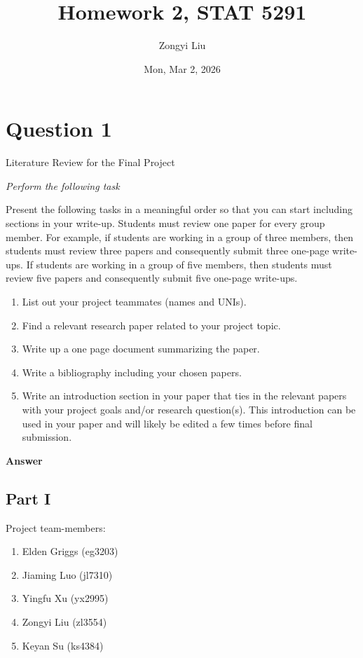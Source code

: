 \documentclass[letterpaper]{article}
\title{Homework 2, STAT 5291}
\author{Zongyi Liu}
\date{Mon, Mar 2, 2026}
\begin{document}
	\maketitle
	
	\section{Question 1}
	
	{\color{deepred} Literature Review for the Final Project}
	
	
	\emph{Perform the following task}
	
	Present the following tasks in a meaningful order so that you can start including sections in your write-up. Students must review one paper for every group member. For example, if students are working in a group of three members, then students must review three papers and consequently submit three one-page write-ups. If students are working in a group of five members, then students must review five papers and consequently submit five one-page write-ups.
	
	\begin{enumerate}
		\item[i] List out your project teammates (names and UNIs).
		
		\item[ii] Find a relevant research paper related to your project topic.
		
		\item[iii] Write up a one page document summarizing the paper.
		
		\item[iv] Write a bibliography including your chosen papers.
		
		\item[v] Write an introduction section in your paper that ties in the relevant papers with your project goals and/or research question(s). This introduction can be used in your paper and will likely be edited a few times before final submission.
	\end{enumerate}
	
	\textbf{Answer}
	
	\subsection{Part I}
	
	Project team-members:
	
	\begin{enumerate}
		\item Elden Griggs (eg3203)
		\item Jiaming Luo (jl7310)
		\item Yingfu Xu (yx2995)
		\item Zongyi Liu (zl3554)
		\item Keyan Su (ks4384)
		
	\end{enumerate}
	
\end{document}

